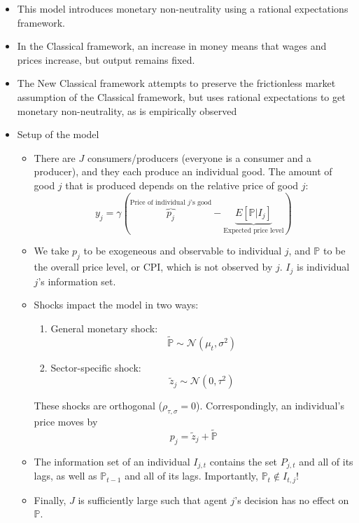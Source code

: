 \documentclass[12pt]{article}
\begin{document}
\begin{itemize}
    \item This model introduces monetary non-neutrality using a rational expectations framework.
    \item In the Classical framework, an increase in money means that wages and prices increase, but output remains fixed. 
    \item The New Classical framework attempts to preserve the frictionless market assumption of the Classical framework, but uses rational expectations to get monetary non-neutrality, as is empirically observed
    \item Setup of the model
    \begin{itemize}
        \item There are $J$ consumers/producers (everyone is a consumer and a producer), and they each produce an individual good. The amount of good $j$ that is produced depends on the relative price of good $j$:
        \begin{equation}
            y_j = \gamma \left(\overbrace{p_j}^{\text{Price of individual $j$'s good}} - \underbrace{E[\mathbb{P}|I_j]}_{\text{Expected price level}}\right)
        \end{equation}
        \item We take $p_j$ to be exogeneous and observable to individual $j$, and $\mathbb{P}$ to be the overall price level, or CPI, which is not observed by $j$. $I_j$ is individual $j$'s information set. 
        \item Shocks impact the model in two ways:
        \begin{enumerate}
            \item General monetary shock: 
            \[\widetilde{\mathbb{P}} \sim \mathcal{N}(\mu_t, \sigma^2)\]
            \item Sector-specific shock:
            \[\widetilde{z}_j \sim \mathcal{N}(0, \tau^2)\]
        \end{enumerate}
        These shocks are orthogonal ($\rho_{\tau,\sigma} = 0$). Correspondingly, an individual's price moves by
        \[p_j = \widetilde{z}_j + \widetilde{\mathbb{P}}\]
        \item The information set of an individual $I_{j,t}$ contains the set $P_{j,t}$ and all of its lags, as well as $\mathbb{P}_{t-1}$ and all of its lags. Importantly, $\mathbb{P}_t \notin I_{t,j}$!
        \item Finally, $J$ is sufficiently large such that agent $j$'s decision has no effect on $\mathbb{P}$.

\end{itemize}
\end{itemize}
\end{document}
